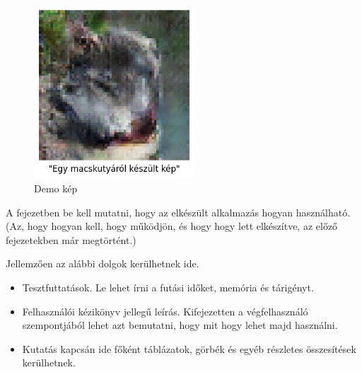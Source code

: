 
\begin{figure}[h]
	\centering
	\includegraphics[width=6cm]{images/demo1.png}
	\caption{Demo kép}
	\label{fig:demo}
\end{figure}

A fejezetben be kell mutatni, hogy az elkészült alkalmazás hogyan használható.
(Az, hogy hogyan kell, hogy működjön, és hogy hogy lett elkészítve, az előző fejezetekben már megtörtént.)

Jellemzően az alábbi dolgok kerülhetnek ide.
\begin{itemize}
	\item Tesztfuttatások. Le lehet írni a futási időket, memória és tárigényt.
	\item Felhasználói kézikönyv jellegű leírás. Kifejezetten a végfelhasználó szempontjából lehet azt bemutatni, hogy mit hogy lehet majd használni.
	\item Kutatás kapcsán ide főként táblázatok, görbék és egyéb részletes összesítések kerülhetnek.
\end{itemize}